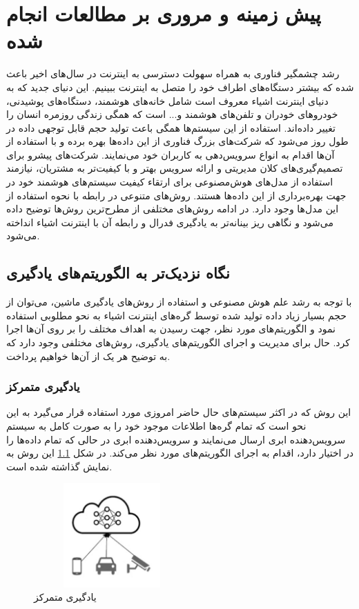 \chapter{پیش زمینه و مروری بر مطالعات انجام شده}

رشد چشمگیر فناوری به همراه سهولت دسترسی به اینترنت در سال‌های اخیر باعث شده که بیشتر دستگاه‌های اطراف خود را متصل به اینترنت ببینیم. این دنیای جدید که به دنیای اینترنت اشیاء معروف است شامل خانه‌های هوشمند، دستگاه‌های پوشیدنی، خودروهای خودران و تلفن‌های هوشمند و... است که همگی زندگی روزمره انسان را تغییر داده‌اند. استفاده از این سیستم‌ها همگی باعث تولید حجم قابل توجهی داده در طول روز می‌شود که شرکت‌های بزرگ فناوری از این داده‌ها بهره برده و با استفاده از آن‌ها اقدام به انواع سرویس‌دهی به کاربران خود می‌نمایند\cite{b8}. شرکت‌های پیشرو برای تصمیم‌گیری‌های کلان مدیریتی و ارائه سرویس بهتر و با کیفیت‌تر به مشتریان، نیازمند استفاده از مدل‌های هوش‌مصنوعی برای ارتقاء کیفیت سیستم‌های هوشمند خود در جهت بهره‌برداری از این داده‌ها هستند. روش‌های متنوعی در رابطه با نحوه استفاده از این مدل‌ها وجود دارد. در ادامه روش‌های مختلفی از مطرح‌ترین روش‌ها توضیح داده می‌شود و نگاهی ریز بینانه‌تر به یادگیری فدرال و رابطه‌ آن با اینترنت اشیاء انداخته می‌شود\cite{ref5}.

\section{نگاه نزدیک‌تر به الگوریتم‌های یادگیری}

با توجه به رشد علم هوش مصنوعی و استفاده از روش‌های یادگیری ماشین، می‌توان از حجم بسیار زیاد داده تولید شده توسط گره‌های اینترنت اشیاء به نحو مطلوبی استفاده نمود و الگوریتم‌های مورد نظر، جهت رسیدن به اهداف مختلف را بر روی آن‌ها اجرا کرد. حال برای مدیریت و اجرای الگوریتم‌های یادگیری، روش‌های مختلفی وجود دارد که به توضیح هر یک از آن‌ها خواهیم پرداخت.

\subsection{یادگیری متمرکز}

این روش که در اکثر سیستم‌های حال حاضر امروزی مورد استفاده قرار می‌گیرد به این نحو است که تمام گره‌ها اطلاعات موجود خود را به صورت کامل به سیستم سرویس‌دهنده ابری ارسال می‌نمایند و سرویس‌دهنده ابری در حالی که تمام داده‌ها را در اختیار دارد، اقدام به اجرای الگوریتم‌های مورد نظر می‌کند. در شکل \ref{centralized} این روش به نمایش گذاشته شده است.

    \begin{figure}[H]
      \centering
      \includegraphics[height=4cm,width=6cm]{./types of ML/centralized .jpg}
      \caption[یادگیری متمرکز]{ یادگیری متمرکز\cite{ref6}}
      \label{centralized}
      \centering
    \end{figure}

